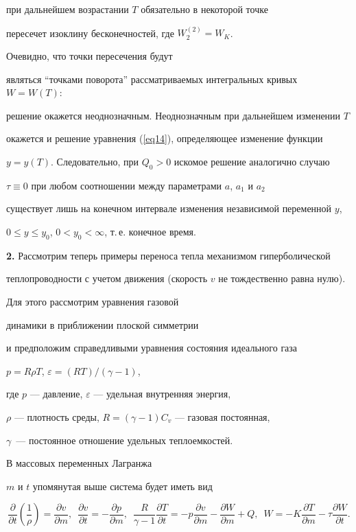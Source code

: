 при дальнейшем возрастании $T$ обязательно в некоторой точке


пересечет изоклину бесконечностей, где $W_2^{(2)}=W_K$.


Очевидно, что точки пересечения будут


являться ``точками поворота'' рассматриваемых интегральных кривых $W=W(T)$:


решение окажется неоднозначным. Неоднозначным при дальнейшем изменении $T$


окажется и решение уравнения (\ref{eq14}), определяющее изменение функции


$y=y(T)$. Следовательно, при $Q_0>0$ искомое решение аналогично случаю


$\tau\equiv0$ при любом соотношении между параметрами $a$, $a_1$ и $a_2$


существует лишь на конечном интервале изменения независимой переменной $y$,


$0\le y\le y_0$, $0<y_0<\infty$, т.\,е. конечное время.


\medskip





{\bf 2.} Рассмотрим теперь примеры переноса тепла механизмом гиперболической


теплопроводности с учетом движения (скорость $v$ не тождественно равна нулю).


Для этого рассмотрим уравнения газовой 


динамики в приближении плоской симметрии


и предположим справедливыми уравнения состояния идеального газа


$p=R\rho T$, $\varepsilon=(RT)/(\gamma-1)$,


где $p$ --- давление, $\varepsilon$ --- удельная внутренняя энергия,


$\rho$ --- плотность среды, $R=(\gamma-1)C_v$ --- газовая постоянная,


$\gamma$~--- постоянное отношение удельных теплоемкостей. 


В массовых переменных Лагранжа


$m$ и $t$ упомянутая выше система будет иметь вид


\begin{equation}\label{eq21}


\frac{\partial}{\partial t}\left(\frac{1}{\rho}\right)=


\frac{\partial v}{\partial m},\ \;


\frac{\partial v}{\partial t}=-\frac{\partial p}{\partial m},\ \;


\frac{R}{\gamma-1}\frac{\partial T}{\partial t}=


-p\frac{\partial v}{\partial m}


-\frac{\partial W}{\partial m}+Q,\ \;


W=-K\frac{\partial T}{\partial m}-\tau\frac{\partial W}{\partial t}.


\end{equation}


